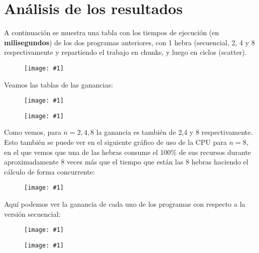 \documentclass[a4paper, 11pt]{article}
\newcommand{\imageins}[4]{\begin{figure}[!ht]		%
    \centering
    \texttt{[image: \#1]}
    \vspace{0.2em}
\end{figure}}
\begin{document}
\section*{Análisis de los resultados}

A continuación se muestra una tabla con los tiempos de ejecución (en \textbf{milisegundos}) de los dos programas anteriores, con 1 hebra (secuencial, 2, 4 y 8 respectivamente y repartiendo el trabajo en chunks, y luego en ciclos (scatter).

\imageins{./images/timetable.png}{1}{}{}

Veamos las tablas de las ganancias:

\imageins{./images/chunk_s.png}{0.8}{}{}
\imageins{./images/scatter_s.png}{0.8}{}{}

Como vemos, para $n=2,4,8$ la ganancia es también de 2,4 y 8 respectivamente. Esto también se puede ver en el siguiente gráfico de uso de la CPU para $n=8$, en el que vemos que una de las hebras consume el 100\% de sus recursos durante aproximadamente 8 veces más que el tiempo que están las 8 hebras haciendo el cálculo de forma concurrente:

\imageins{./images/cpu_usage.png}{1}{}{}

\newpage

Aquí podemos ver la ganancia de cada uno de los programas con respecto a la versión secuencial: 

\imageins{./images/chunk_g.png}{0.8}{}{}
\imageins{./images/scatter_g.png}{0.8}{}{}
\end{document}
